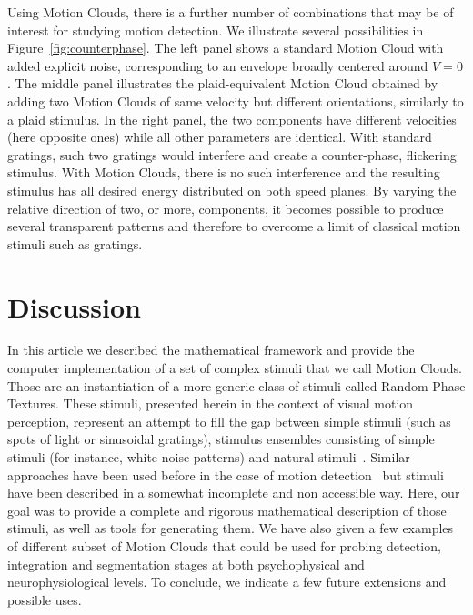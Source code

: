 \documentclass[a4paper,11pt]{article}%
\begin{document}
Using Motion Clouds, there is a further number of combinations that may be of interest for studying motion detection. We illustrate several possibilities in Figure~\ref{fig:counterphase}. The left panel shows a standard Motion Cloud with added explicit noise, corresponding to an envelope broadly centered around $V=0$. The middle panel illustrates the plaid-equivalent Motion Cloud obtained by adding two Motion Clouds of same velocity but different orientations, similarly to a plaid stimulus. In the right panel, the two components have different velocities (here opposite ones) while all other parameters are identical. With standard gratings, such two gratings would interfere and create a {counter-phase}, flickering stimulus. With Motion Clouds, there is no such interference and the resulting stimulus has all desired energy distributed on both speed planes. By varying the relative direction of two, or more, components, it becomes possible to produce several transparent patterns and therefore to overcome a limit of classical motion stimuli such as gratings. %

\section{Discussion}\label{section:future}

In this article we described the mathematical framework and provide the computer implementation of a set of complex stimuli that we call Motion Clouds. Those  are an instantiation of a more generic class of stimuli called Random Phase Textures.  These stimuli, presented herein in the context of visual motion perception, represent an attempt to fill the gap between simple stimuli (such as spots of light or sinusoidal gratings), stimulus ensembles consisting of simple stimuli (for instance, white noise patterns) and natural stimuli~\citep{Felsen2005Natural,Rust05}. Similar approaches have been  used before in the case of motion detection~\citep{Schrater00} but stimuli have been described in a somewhat incomplete and non accessible way. Here, our goal was to provide a complete and rigorous  mathematical description of those stimuli, as well as tools for generating them. We have also given a few examples of different subset of Motion Clouds that could be used for probing detection, integration and segmentation stages at both psychophysical and neurophysiological levels. To conclude, we indicate a few future extensions and possible uses. %
%
\end{document}
